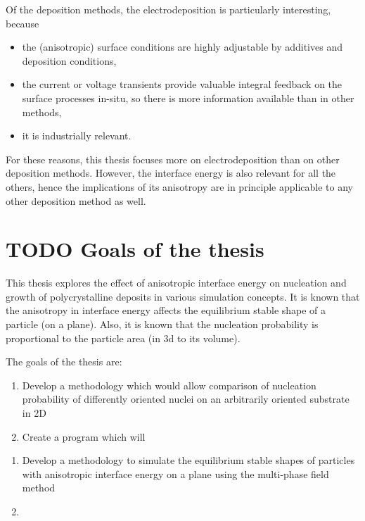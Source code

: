 Of the deposition methods, the electrodeposition is particularly interesting, because
\begin{itemize}
	\item the (anisotropic) surface conditions are highly adjustable by additives and deposition conditions,
	\item the current or voltage transients provide valuable integral feedback on the surface processes in-situ, so there is more information available than in other methods,
	\item it is industrially relevant.
\end{itemize}
For these reasons, this thesis focuses more on electrodeposition than on other deposition methods. However, the interface energy is also relevant for all the others, hence the implications of its anisotropy are in principle applicable to any other deposition method as well. 


\section{TODO Goals of the thesis}
This thesis explores the effect of anisotropic interface energy on nucleation and growth of polycrystalline deposits in various simulation concepts. It is known that the anisotropy in interface energy affects the equilibrium stable shape of a particle (on a plane). Also, it is known that the nucleation probability is proportional to the particle area (in 3d to its volume).

The goals of the thesis are:
\begin{enumerate}
	\item Develop a methodology which would allow comparison of nucleation probability of differently oriented nuclei on an arbitrarily oriented substrate in 2D
	\item Create a program which will 
\end{enumerate}

\begin{enumerate}
	\item Develop a methodology to simulate the equilibrium stable shapes of particles with anisotropic interface energy on a plane using	the multi-phase field method 
	\item 
\end{enumerate}


